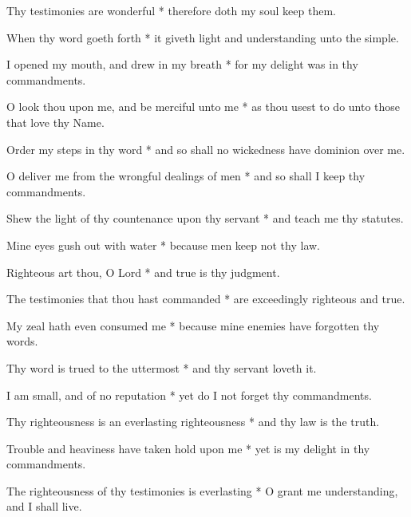 Thy testimonies are wonderful * therefore doth my soul keep them.

When thy word goeth forth * it giveth light and understanding unto the simple.

I opened my mouth, and drew in my breath * for my delight was in thy commandments.

O look thou upon me, and be merciful unto me * as thou usest to do unto those that love thy Name.

Order my steps in thy word * and so shall no wickedness have dominion over me.

O deliver me from the wrongful dealings of men * and so shall I keep thy commandments.

Shew the light of thy countenance upon thy servant * and teach me thy statutes.

Mine eyes gush out with water * because men keep not thy law.

Righteous art thou, O Lord * and true is thy judgment.

The testimonies that thou hast commanded * are exceedingly righteous and true.

My zeal hath even consumed me * because mine enemies have forgotten thy words.

Thy word is trued to the uttermost * and thy servant loveth it.

I am small, and of no reputation * yet do I not forget thy commandments.

Thy righteousness is an everlasting righteousness * and thy law is the truth.

Trouble and heaviness have taken hold upon me * yet is my delight in thy commandments.

The righteousness of thy testimonies is everlasting * O grant me understanding, and I shall live.